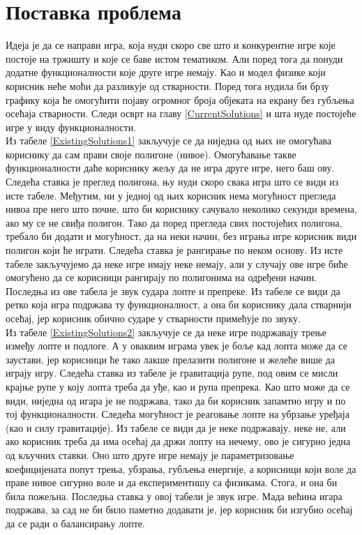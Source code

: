 \chapter{Поставка проблема}\label{GameProblem}

Идеја је да се направи игра, која нуди скоро све што и конкурентне игре које постоје на тржишту и које се баве истом тематиком. Али поред тога да понуди  додатне функционалности које друге игре немају. Као и модел физике који корисник неће моћи да разликује од стварности. Поред тога нудила би брзу графику која ће омогућити појаву огромног броја објеката на екрану без губљења осећаја стварности. Следи осврт на главу \ref{CurrentSolutions} и шта нуде постојеће игре у виду функционалности.
\\ \indent
 Из табеле \ref{ExistingSolutions1} закључује се да ниједна од њих не омогућава кориснику да сам прави своје полигоне (нивое). Омогућавање такве функционалности даће кориснику жељу да не игра друге игре, него баш ову. Следећа ставка је преглед полигона, њу нуди скоро свака игра што се види из исте табеле. Међутим, ни у једној од њих корисник нема могућност прегледа нивоа пре него што почне, што би кориснику сачувало неколико секунди времена, ако му се не свиђа полигон. Тако да поред прегледа свих постојећих полигона, требало би додати и могућност, да на неки начин, без играња игре корисник види полигон који ће играти. Следећа ставка је рангирање по неком основу. Из исте табеле закључујемо да неке игре имају неке немају, али у случају ове игре биће омогућено да се корисници рангирају по полигонима на одређени начин. Последња из ове табела је звук судара лопте и препреке. Из табеле се види да ретко која игра подржава ту функционалност, а она би кориснику дала стварнији осећај, јер корисник обично сударе у стварности примећује по звуку.
\\ \indent
Из табеле \ref{ExistingSolutions2} закључује се да неке игре подржавају трење између лопте и подлоге. А у оваквим играма увек је боље кад лопта може да се заустави, јер корисници ће тако лакше прелазити полигоне и желеће више да играју игру. Следећа ставка из табеле је гравитација рупе, под овим се мисли крајње рупе у коју лопта треба да уђе, као и рупа препрека. Као што може да се види, ниједна од игара је не подржава, тако да би корисник запамтио игру и по тој функционалности. Следећа могућност је реаговање лопте на убрзање уређаја (као и силу гравитације). Из табеле се види да је неке подржавају, неке не, али ако корисник треба да има осећај да држи лопту на нечему, ово је сигурно једна од кључних ставки. Оно што друге игре немају је параметризовање коефицијената попут трења, убзрања, губљења енергије, а корисници који воле да праве нивое сигурно воле и да експериментишу са физикама. Стога, и она би била пожељна. Последња ставка у овој табели је звук игре. Мада већина игара подржава, за сад не би било паметно додавати је, јер корисник би изгубио осећај да се ради о балансирању лопте.
